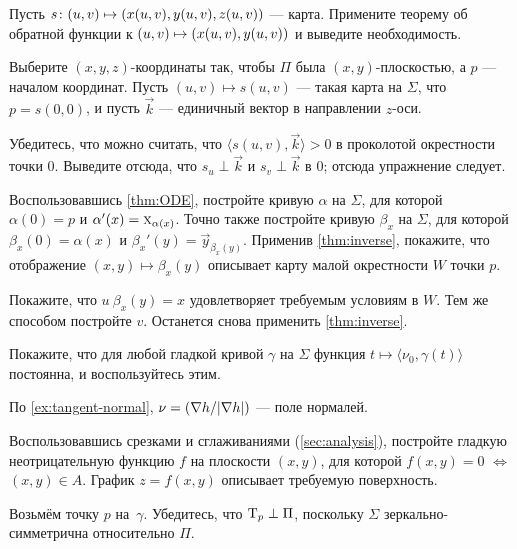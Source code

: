 Пусть
$s\:(u,v)\z\mapsto(x(u,v),y(u,v),z(u,v))$ --- карта.
Примените теорему об обратной функции к $(u,v)\z\mapsto(x(u,v),y(u,v))$ и выведите необходимость.

Выберите $(x,y,z)$-координаты так, чтобы $\Pi$ была $(x,y)$-плоскостью, а $p$ --- началом координат.
Пусть $(u,v)\mapsto s(u,v)$ --- такая карта на $\Sigma$, что $p=s(0,0)$,
и пусть $\vec k$ --- единичный вектор в направлении $z$-оси.

Убедитесь, что можно считать, что $\langle s(u,v),\vec k\rangle>0$ в проколотой окрестности точки $0$.
Выведите отсюда, что $s_u\perp \vec k$ и $s_v\perp \vec k$ в
$0$; отсюда упражнение следует.

Воспользовавшись \ref{thm:ODE}, постройте кривую $\alpha$ на $\Sigma$, для которой $\alpha(0)=p$ и $\alpha'(x)\z=\vec x_{\alpha(x)}$.
Точно также постройте кривую $\beta_x$ на $\Sigma$, для которой $\beta_x(0)=\alpha(x)$ и $\beta_x'(y)=\vec y_{\beta_x(y)}$.
Применив \ref{thm:inverse}, покажите, что отображение $(x,y)\mapsto \beta_x(y)$ описывает карту малой окрестности $W$ точки $p$.

Покажите, что $u\:\beta_x(y)= x$ удовлетворяет требуемым условиям в $W$.
Тем же способом постройте $v$.
Останется снова применить \ref{thm:inverse}.

Покажите, что для любой гладкой кривой $\gamma$ на $\Sigma$ функция $t\mapsto \langle\nu_0,\gamma(t)\rangle$ постоянна, и воспользуйтесь этим.

По \ref{ex:tangent-normal}, $\nu=(\nabla h/|\nabla h|)$ --- поле нормалей.

Воспользовавшись срезками и сглаживаниями (\ref{sec:analysis}), постройте гладкую неотрицательную функцию $f$ на плоскости $(x,y)$, для которой $f(x,y)=0$ $\Leftrightarrow$ $(x,y)\in A$.
График $z=f(x,y)$ описывает требуемую поверхность.


\setcounter{eqtn}{0}

Возьмём точку $p$ на~$\gamma$.
Убедитесь, что $\mathrm{T}_p\perp \Pi$, поскольку $\Sigma$ зеркально-симметрична относительно $\Pi$.

